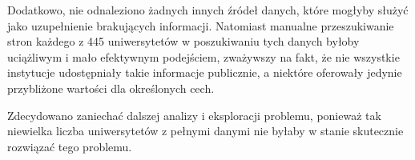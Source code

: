 \documentclass[conference]{IEEEtran}
\begin{document}
Dodatkowo, nie odnaleziono żadnych innych źródeł danych, które mogłyby służyć jako uzupełnienie brakujących informacji. Natomiast manualne przeszukiwanie stron każdego z 445 uniwersytetów w poszukiwaniu tych danych byłoby uciążliwym i mało efektywnym podejściem, zważywszy na fakt, że nie wszystkie instytucje udostępniały takie informacje publicznie, a niektóre oferowały jedynie przybliżone wartości dla określonych cech.

Zdecydowano zaniechać dalszej analizy i eksploracji problemu, ponieważ tak niewielka liczba uniwersytetów z pełnymi danymi nie byłaby w stanie skutecznie rozwiązać tego problemu.

\end{document}
